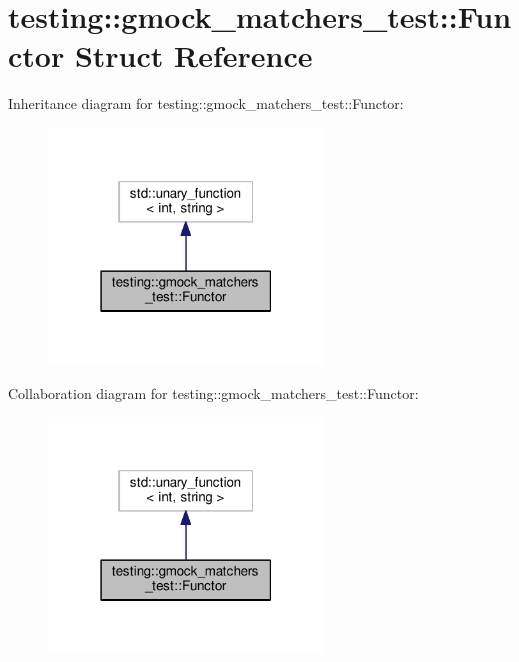 \hypertarget{structtesting_1_1gmock__matchers__test_1_1Functor}{}\section{testing\+:\+:gmock\+\_\+matchers\+\_\+test\+:\+:Functor Struct Reference}
\label{structtesting_1_1gmock__matchers__test_1_1Functor}


Inheritance diagram for testing\+:\+:gmock\+\_\+matchers\+\_\+test\+:\+:Functor\+:
\nopagebreak
\begin{figure}[H]
\begin{center}
\leavevmode
\includegraphics[width=207pt]{structtesting_1_1gmock__matchers__test_1_1Functor__inherit__graph}
\end{center}
\end{figure}


Collaboration diagram for testing\+:\+:gmock\+\_\+matchers\+\_\+test\+:\+:Functor\+:
\nopagebreak
\begin{figure}[H]
\begin{center}
\leavevmode
\includegraphics[width=207pt]{structtesting_1_1gmock__matchers__test_1_1Functor__coll__graph}
\end{center}
\end{figure}
